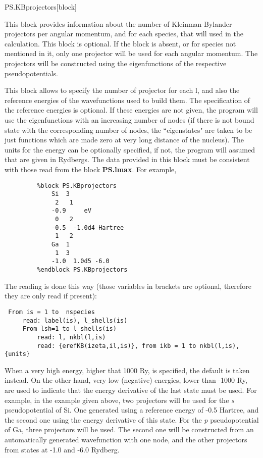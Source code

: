 \begin{fdfentry}{PS.KBprojectors}[block]

This block provides information about the number of Kleinman-Bylander
projectors per angular momentum, and for each species, that will used
in the calculation. This block is optional.
If the block is absent, or for species not mentioned in it, only
one projector will be used for each angular momentum. The projectors
will be constructed using the eigenfunctions of the respective
pseudopotentials.


This block allows to specify the number of projector for each l, and also
the reference energies of the wavefunctions used to build them.
The specification of the reference energies is optional. If these
energies are not given, the program will use the eigenfunctions with an
increasing number of nodes (if there is not bound state with
the corresponding number of nodes, the ``eigenstates" are taken to be just
functions which are made zero at very long distance of the nucleus).
The units for the energy can be optionally specified, if not, the
program will assumed that are given in Rydbergs.
The data provided in this block must be consistent with those
read from the block \textbf{PS.lmax}. For example,

\begin{verbatim}
         %block PS.KBprojectors
             Si  3
              2   1
             -0.9     eV
              0   2
             -0.5  -1.0d4 Hartree
              1   2
             Ga  1
              1  3
             -1.0  1.0d5 -6.0
         %endblock PS.KBprojectors
\end{verbatim}

The reading is done this way (those variables in brackets are optional,
therefore they are only read if
present):

\begin{verbatim}
 From is = 1 to  nspecies
     read: label(is), l_shells(is)
     From lsh=1 to l_shells(is)
         read: l, nkbl(l,is)
         read: {erefKB(izeta,il,is)}, from ikb = 1 to nkbl(l,is), {units}
\end{verbatim}

When a very high energy, higher that 1000 Ry, is specified, the
default is taken instead.  On the other hand, very low (negative)
energies, lower than -1000 Ry, are used to indicate that the energy
derivative of the last state must be used. For example, in the example
given above, two projectors will be used for the \textit{s}
pseudopotential of Si. One generated using a reference energy of -0.5
Hartree, and the second one using the energy derivative of this
state. For the \textit{p} pseudopotential of Ga, three projectors will be
used.  The second one will be constructed from an automatically
generated wavefunction with one node, and the other projectors from
states at -1.0 and -6.0 Rydberg.


\end{fdfentry}
